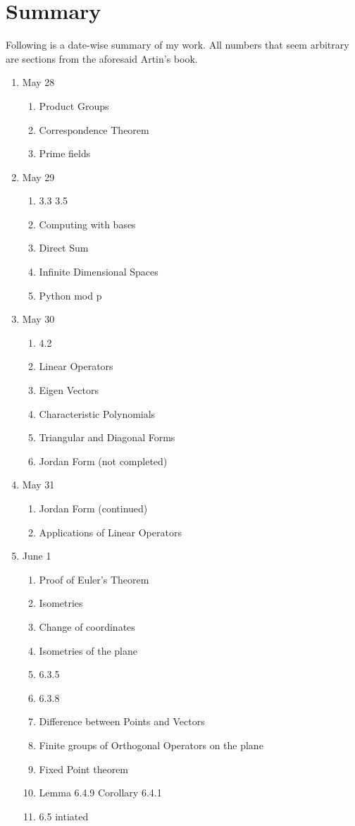\section{Summary}
Following is a date-wise summary of my work. All numbers that seem arbitrary are sections from the aforesaid Artin's book.
	\begin{enumerate}

		\item May 28
		\begin{enumerate}
			\item Product Groups
			\item Correspondence Theorem
			\item Prime fields
		\end{enumerate}

		\item May 29
		\begin{enumerate}
			\item 3.3 3.5
			\item Computing with bases
			\item Direct Sum
			\item Infinite Dimensional Spaces
			\item Python mod p
		\end{enumerate}
		
		\item May 30
		\begin{enumerate}
		\item 4.2
		\item Linear Operators
		\item Eigen Vectors
		\item Characteristic Polynomials
		\item Triangular and Diagonal Forms
		\item Jordan Form (not completed)
		\end{enumerate}
		
		\item May 31
		\begin{enumerate}
		\item Jordan Form (continued)
		\item Applications of Linear Operators
		\end{enumerate}
		
		\item June 1
		\begin{enumerate}
		\item Proof of Euler's Theorem
		\item Isometries
		\item Change of coordinates
		\item Isometries of the plane
		\item 6.3.5
		\item 6.3.8
		\item Difference between Points and Vectors
		\item Finite groups of Orthogonal Operators on the plane
		\item Fixed Point theorem
		\item Lemma 6.4.9 Corollary 6.4.1
		\item 6.5 intiated
		\end{enumerate}
		

\end{enumerate}
